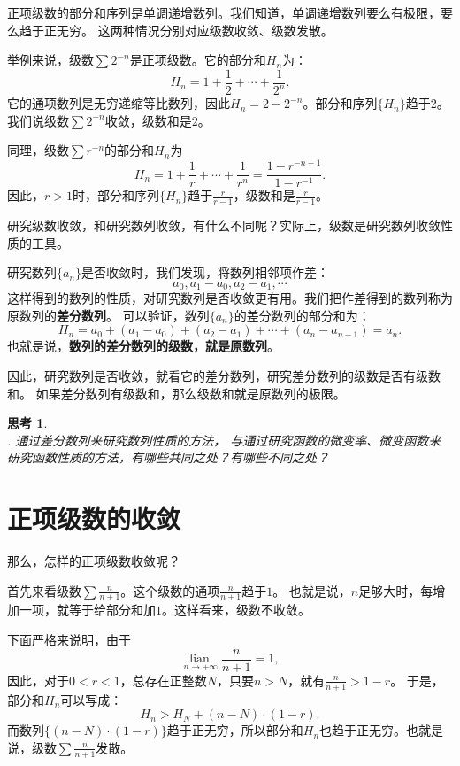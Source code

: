 \documentclass[12pt,UTF8]{ctexbook}
\newcommand{\lian}[1]{
    \underset{#1}{\operatorname{lian}\,}
}
\theoremstyle{definition}
\theoremstyle{plain}
\newtheorem{sk}{思考}[section]
\begin{document}
正项级数的部分和序列是单调递增数列。我们知道，单调递增数列要么有极限，要么趋于正无穷。
这两种情况分别对应级数收敛、级数发散。

举例来说，级数$\sum 2^{-n}$是正项级数。它的部分和$H_n$为：
$$ H_n = 1 + \frac{1}{2} + \cdots + \frac{1}{2^n}.$$
它的通项数列是无穷递缩等比数列，因此$H_n = 2 - 2^{-n}$。部分和序列$\{H_n\}$趋于$2$。
我们说级数$\sum 2^{-n}$收敛，级数和是$2$。

同理，级数$\sum r^{-n}$的部分和$H_n$为
$$ H_n = 1 + \frac{1}{r} + \cdots + \frac{1}{r^n} = \frac{1 - r^{-n-1}}{1 - r^{-1}}.$$
因此，$r>1$时，部分和序列$\{H_n\}$趋于$\frac{r}{r - 1}$，级数和是$\frac{r}{r - 1}$。

研究级数收敛，和研究数列收敛，有什么不同呢？实际上，级数是研究数列收敛性质的工具。

研究数列$\{a_n\}$是否收敛时，我们发现，将数列相邻项作差：
$$ a_0, a_1 - a_0, a_2 - a_1, \cdots $$
这样得到的数列的性质，对研究数列是否收敛更有用。我们把作差得到的数列称为原数列的\textbf{差分数列}。
可以验证，数列$\{a_n\}$的差分数列的部分和为：
$$ H_n = a_0 + (a_1 - a_0) + (a_2 - a_1) + \cdots + (a_n - a_{n-1}) = a_n. $$
也就是说，\textbf{数列的差分数列的级数，就是原数列}。

因此，研究数列是否收敛，就看它的差分数列，研究差分数列的级数是否有级数和。
如果差分数列有级数和，那么级数和就是原数列的极限。

\begin{sk}
    \mbox{} \\
    . 通过差分数列来研究数列性质的方法，
    与通过研究函数的微变率、微变函数来研究函数性质的方法，有哪些共同之处？有哪些不同之处？
\end{sk}

\section{正项级数的收敛}
那么，怎样的正项级数收敛呢？

首先来看级数$\sum \frac{n}{n+1}$。这个级数的通项$\frac{n}{n+1}$趋于$1$。
也就是说，$n$足够大时，每增加一项，就等于给部分和加$1$。这样看来，级数不收敛。

下面严格来说明，由于
$$\lian{n\to +\infty }\frac{n}{n+1} = 1,$$
因此，对于$0<r<1$，总存在正整数$N$，只要$n>N$，就有$\frac{n}{n+1} > 1 - r$。
于是，部分和$H_n$可以写成：
$$ H_n > H_N + (n - N) \cdot (1 - r).$$
而数列$\{(n - N) \cdot (1 - r)\}$趋于正无穷，所以部分和$H_n$也趋于正无穷。也就是说，级数$\sum \frac{n}{n+1}$发散。
\end{document}
